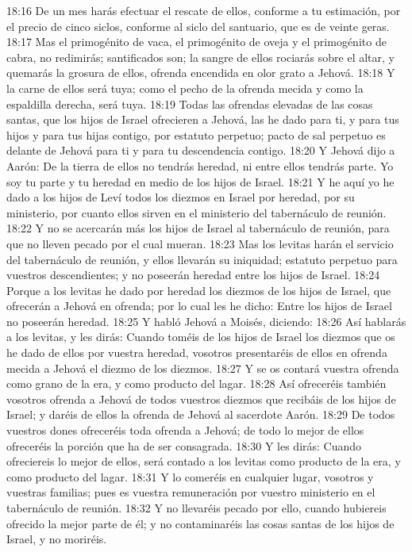 18:16 De un mes harás efectuar el rescate de ellos, conforme a tu estimación, por el precio de cinco siclos,  conforme al siclo del santuario, que es de veinte geras.  
18:17 Mas el primogénito de vaca, el primogénito de oveja y el primogénito de cabra, no redimirás; santificados son; la sangre de ellos rociarás sobre el altar, y quemarás la grosura de ellos, ofrenda encendida en olor grato a Jehová.  
18:18 Y la carne de ellos será tuya; como el pecho de la ofrenda mecida y como la espaldilla derecha, será tuya.  
18:19 Todas las ofrendas elevadas de las cosas santas, que los hijos de Israel ofrecieren a Jehová, las he dado para ti, y para tus hijos y para tus hijas contigo, por estatuto perpetuo; pacto de sal perpetuo es delante de Jehová para ti y para tu descendencia contigo.  
18:20 Y Jehová dijo a Aarón: De la tierra de ellos no tendrás heredad, ni entre ellos tendrás parte. Yo soy tu parte y tu heredad en medio de los hijos de Israel.  
18:21 Y he aquí yo he dado a los hijos de Leví todos los diezmos  en Israel por heredad, por su ministerio, por cuanto ellos sirven en el ministerio del tabernáculo de reunión.  
18:22 Y no se acercarán más los hijos de Israel al tabernáculo de reunión, para que no lleven pecado por el cual mueran.  
18:23 Mas los levitas harán el servicio del tabernáculo de reunión, y ellos llevarán su iniquidad; estatuto perpetuo para vuestros descendientes; y no poseerán heredad entre los hijos de Israel.  
18:24 Porque a los levitas he dado por heredad los diezmos de los hijos de Israel, que ofrecerán a Jehová en ofrenda; por lo cual les he dicho: Entre los hijos de Israel no poseerán heredad.  
18:25 Y habló Jehová a Moisés, diciendo:  
18:26 Así hablarás a los levitas, y les dirás: Cuando toméis de los hijos de Israel los diezmos que os he dado de ellos por vuestra heredad, vosotros presentaréis de ellos en ofrenda mecida a Jehová el diezmo de los diezmos.  
18:27 Y se os contará vuestra ofrenda como grano de la era, y como producto del lagar.  
18:28 Así ofreceréis también vosotros ofrenda a Jehová de todos vuestros diezmos que recibáis de los hijos de Israel; y daréis de ellos la ofrenda de Jehová al sacerdote Aarón.  
18:29 De todos vuestros dones ofreceréis toda ofrenda a Jehová; de todo lo mejor de ellos ofreceréis la porción que ha de ser consagrada.  
18:30 Y les dirás: Cuando ofreciereis lo mejor de ellos, será contado a los levitas como producto de la era, y como producto del lagar.  
18:31 Y lo comeréis en cualquier lugar, vosotros y vuestras familias; pues es vuestra remuneración por vuestro ministerio en el tabernáculo de reunión.  
18:32 Y no llevaréis pecado por ello, cuando hubiereis ofrecido la mejor parte de él; y no contaminaréis las cosas santas de los hijos de Israel, y no moriréis. 
  
